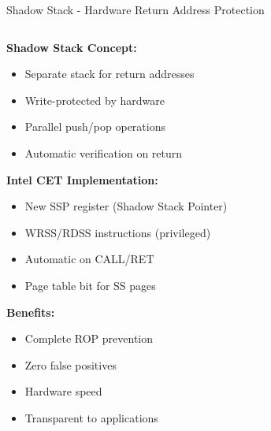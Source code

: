 \documentclass[aspectratio=169,12pt]{beamer}
\begin{document}
\begin{frame}[fragile]{Shadow Stack - Hardware Return Address Protection}
    \begin{columns}
        \begin{column}{0.5\textwidth}
            \textbf{Shadow Stack Concept:}
            \begin{itemize}
                \item Separate stack for return addresses
                \item Write-protected by hardware
                \item Parallel push/pop operations
                \item Automatic verification on return
            \end{itemize}
            
            \vspace{0.3cm}
            \textbf{Intel CET Implementation:}
            \begin{itemize}
                \item New SSP register (Shadow Stack Pointer)
                \item WRSS/RDSS instructions (privileged)
                \item Automatic on CALL/RET
                \item Page table bit for SS pages
            \end{itemize}
            
            \vspace{0.3cm}
            \textbf{Benefits:}
            \begin{itemize}
                \item Complete ROP prevention
                \item Zero false positives
                \item Hardware speed
                \item Transparent to applications
            \end{itemize}
        \end{column}
        \begin{column}{0.5\textwidth}
\end{column}
\end{columns}
\end{frame}
\end{document}
